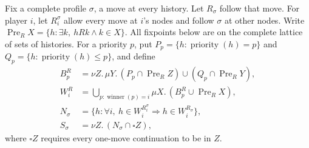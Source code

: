 Fix a complete profile $\sigma$, a move at every history. Let
$R_\sigma$ follow that move. For player $i$, let $R_i^\sigma$ allow
every move at $i$'s nodes and follow $\sigma$ at other nodes. Write
$\operatorname{Pre}_R X=\{h:\exists k,\ hRk\land k\in X\}$.
All fixpoints below are on the complete lattice of sets of histories.
For a priority $p$, put $P_p=\{h:\operatorname{priority}(h)=p\}$ and
$Q_p=\{h:\operatorname{priority}(h)\leq p\}$, and define
\begin{align*}
 B_p^R&=\nu Z.\,\mu Y.\,
       (P_p\cap\operatorname{Pre}_R Z)
       \cup(Q_p\cap\operatorname{Pre}_R Y),\\
 W_i^R&=\bigcup_{p:\operatorname{winner}(p)=i}
       \mu X.\,(B_p^R\cup\operatorname{Pre}_R X),\\
 N_\sigma&=\{h:\forall i,\ h\in W_i^{R_i^\sigma}
                              \Longrightarrow h\in W_i^{R_\sigma}\},\\
 S_\sigma&=\nu Z.\,(N_\sigma\cap\square Z),
\end{align*}
where $\square Z$ requires every one-move continuation to be in $Z$.

